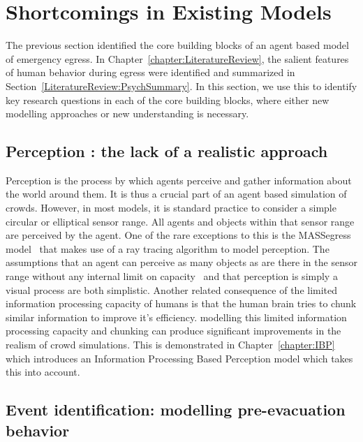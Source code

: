 \section{Shortcomings in Existing Models} %
\label{sec:shortcomings_in_existing_models}

The previous section identified the core building blocks of an agent based model of emergency egress. In Chapter~\ref{chapter:LiteratureReview}, the salient features of human behavior during egress were identified and summarized in Section~\ref{LiteratureReview:PsychSummary}. In this section, we use this to identify key research questions in each of the core building blocks, where either new modelling approaches or new understanding is necessary.


\subsection{Perception : the lack of a realistic approach}
\label{IBEVAC:PerceptionShortcomings}


    Perception is the process by which agents perceive and gather information about the world around them. It is thus a crucial part of an agent based simulation of crowds. However, in most models, it is standard practice to consider a simple circular or elliptical sensor range. All agents and objects within that sensor range are perceived by the agent. One of the rare exceptions to this is the MASSegress model~\cite{Pan:2006vp} that makes use of a ray tracing algorithm to model perception. The assumptions that an agent can perceive as many objects as are there in the sensor range without any internal limit on capacity~\cite{Miller:1956tr} and that perception is simply a visual process are both simplistic. Another related consequence of the limited information processing capacity of humans is that the human brain tries to chunk similar information to improve it's efficiency. modelling this limited information processing capacity and chunking can produce significant improvements in the realism of crowd simulations. This is demonstrated in Chapter~\ref{chapter:IBP} which introduces an Information Processing Based Perception model which takes this into account.


\subsection{Event identification: modelling pre-evacuation behavior}
\label{IBEVAC:EventIdentificationShortcomings}

